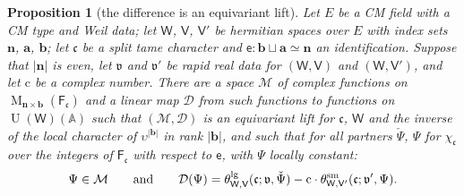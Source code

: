 \documentclass[11pt,a4paper]{article}
\theoremstyle{plainx}
\newtheorem{proposition}[theorem]{Proposition}
\theoremstyle{uprightx}
\newcommand{\dL}{\check{\Psi}}         %
\newcommand{\dS}{\Psi}                 %
\newcommand{\sF}{\mathsf{F}}
\newcommand{\ba}{\mathbf{a}}
\newcommand{\bb}{\mathbf{b}}
\newcommand{\bn}{\mathbf{n}}
\newcommand{\sW}{\mathsf{W}}
\newcommand{\sV}{\mathsf{V}}
\newcommand{\se}{\mathsf{e}}
\newcommand{\fc}{\mathfrak{c}}
\newcommand{\fv}{\mathfrak{v}}
\newcommand{\rc}{\mathrm{c}}
\newcommand{\A}{\mathbb{A}}
\newcommand{\U}{\operatorname{U}}
\newcommand{\cM}{\mathcal{M}}
\newcommand{\cD}{\mathcal{D}}
\newcommand{\Mat}[2]{\operatorname{M}_{#1\times#2}}
\newcommand{\thL}[5]{\theta^{\mathrm{lg}}_{#1,#2}(#3;#4,#5)}
\begin{document}
\begin{proposition}[the difference is an equivariant lift]\label{p:lift}
Let $E$ be a CM field with a CM type and Weil data; let $\sW$, $\sV$, $\sV'$ be hermitian spaces over $E$ with
index sets $\bn$, $\ba$, $\bb$; let $\fc$ be a split tame character and $\se\colon\bb\sqcup\ba\simeq\bn$ an
identification. Suppose that $|\bn|$ is even, let $\fv$ and $\fv'$ be rapid real data for $(\sW,\sV)$ and
$(\sW,\sV')$, and let $\rc$ be a complex number. There are a space $\cM$ of complex functions on
$\Mat{\bn}{\bb}(\sF_{\fc})$ and a linear map $\cD$ from such functions to functions on $\U(\sW)(\A)$ such that
$(\cM,\cD)$ is an equivariant lift for $\fc$, $\sW$ and the inverse of the local character of $\upsilon^{|\bb|}$ in
rank $|\bb|$, and such that for all partners $\dL$, $\dS$ for $\chi_{\fc}$ over the integers of $\sF_{\fc}$ with
respect to $\se$, with $\dS$ locally constant:
\[\dS\in\cM\qquad\text{and}\qquad
\cD(\dS)=\thL{\sW}{\sV}{\fc}{\fv}{\dL}-\rc\cdot\thetaSmall{\sW}{\sV'}{\fc}{\fv'}{\dS}.\]
\end{proposition}
\end{document}
